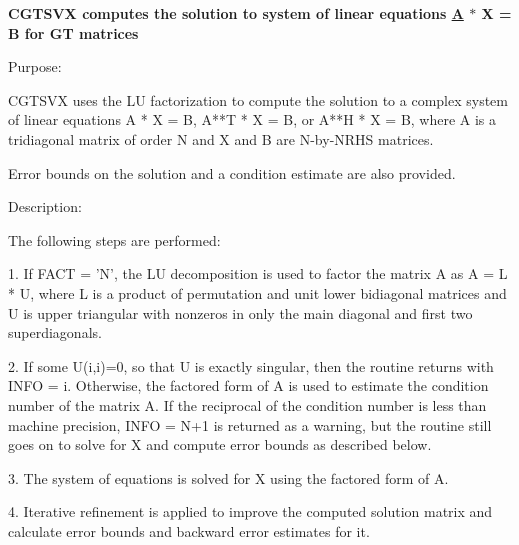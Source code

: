 {\bfseries  C\+G\+T\+S\+V\+X computes the solution to system of linear equations \hyperlink{classA}{A} $\ast$ X = B for G\+T matrices {\bfseries  }}

 \begin{DoxyParagraph}{Purpose\+: }
\begin{DoxyVerb} CGTSVX uses the LU factorization to compute the solution to a complex
 system of linear equations A * X = B, A**T * X = B, or A**H * X = B,
 where A is a tridiagonal matrix of order N and X and B are N-by-NRHS
 matrices.

 Error bounds on the solution and a condition estimate are also
 provided.\end{DoxyVerb}
 
\end{DoxyParagraph}
\begin{DoxyParagraph}{Description\+: }
\begin{DoxyVerb} The following steps are performed:

 1. If FACT = 'N', the LU decomposition is used to factor the matrix A
    as A = L * U, where L is a product of permutation and unit lower
    bidiagonal matrices and U is upper triangular with nonzeros in
    only the main diagonal and first two superdiagonals.

 2. If some U(i,i)=0, so that U is exactly singular, then the routine
    returns with INFO = i. Otherwise, the factored form of A is used
    to estimate the condition number of the matrix A.  If the
    reciprocal of the condition number is less than machine precision,
    INFO = N+1 is returned as a warning, but the routine still goes on
    to solve for X and compute error bounds as described below.

 3. The system of equations is solved for X using the factored form
    of A.

 4. Iterative refinement is applied to improve the computed solution
    matrix and calculate error bounds and backward error estimates
    for it.\end{DoxyVerb}
 
\end{DoxyParagraph}

